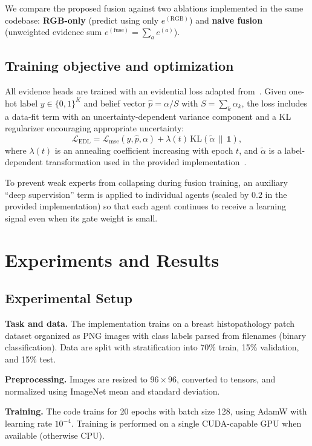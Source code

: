 \documentclass[10pt]{article}
\begin{document}
We compare the proposed fusion against two ablations implemented in the same codebase: \textbf{RGB-only} (predict using only $e^{(\mathrm{RGB})}$) and \textbf{naive fusion} (unweighted evidence sum $e^{(\mathrm{fuse})} = \sum_a e^{(a)}$).

\subsection{Training objective and optimization}
All evidence heads are trained with an evidential loss adapted from~\cite{sensoy2018}. Given one-hot label $y \in \{0,1\}^K$ and belief vector $\hat{p}=\alpha/S$ with $S=\sum_k \alpha_k$, the loss includes a data-fit term with an uncertainty-dependent variance component and a KL regularizer encouraging appropriate uncertainty:
\begin{equation}
  \mathcal{L}_{\mathrm{EDL}} = \mathcal{L}_{\mathrm{mse}}(y, \hat{p}, \alpha) + \lambda(t)\,\mathrm{KL}\!\left(\tilde{\alpha}\,\|\,\mathbf{1}\right),
\end{equation}
where $\lambda(t)$ is an annealing coefficient increasing with epoch $t$, and $\tilde{\alpha}$ is a label-dependent transformation used in the provided implementation~\cite{sensoy2018}.

To prevent weak experts from collapsing during fusion training, an auxiliary ``deep supervision'' term is applied to individual agents (scaled by $0.2$ in the provided implementation) so that each agent continues to receive a learning signal even when its gate weight is small.

\section{Experiments and Results}
\label{sec:exp}

\subsection{Experimental Setup}
\textbf{Task and data.} The implementation trains on a breast histopathology patch dataset organized as PNG images with class labels parsed from filenames (binary classification). Data are split with stratification into 70\% train, 15\% validation, and 15\% test.

\textbf{Preprocessing.} Images are resized to $96 \times 96$, converted to tensors, and normalized using ImageNet mean and standard deviation.

\textbf{Training.} The code trains for 20 epochs with batch size 128, using AdamW with learning rate $10^{-4}$. Training is performed on a single CUDA-capable GPU when available (otherwise CPU).
\end{document}
